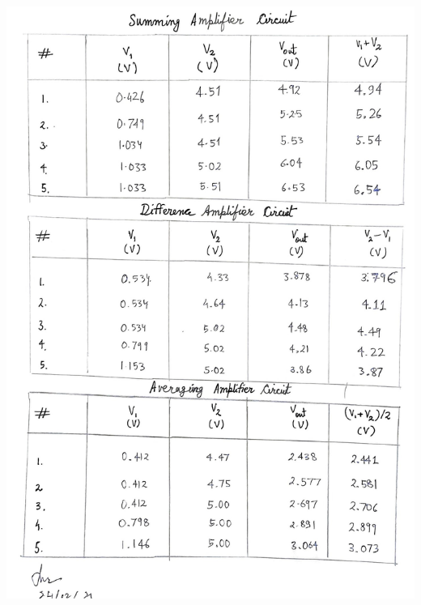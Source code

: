 \begin{center}
    \includegraphics[scale = 0.4]{OPAMP Config/sumdiffavg (2).jpg}
\end{center}
\clearpage
